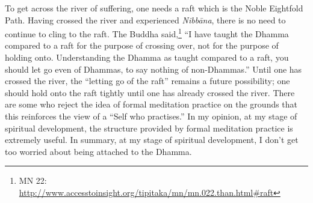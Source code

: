 To get across the river of suffering, one needs a raft which is the Noble Eightfold Path. Having crossed the river and experienced \textit{Nibbāna}, there is no need to continue to cling to the raft. The Buddha said,\footnote{MN 22: \url{http://www.accesstoinsight.org/tipitaka/mn/mn.022.than.html\#raft}} “I have taught the Dhamma compared to a raft for the purpose of crossing over, not for the purpose of holding onto. Understanding the Dhamma as taught compared to a raft, you should let go even of Dhammas, to say nothing of non-Dhammas.” Until one has crossed the river, the “letting go of the raft” remains a future possibility; one should hold onto the raft tightly until one has already crossed the river. There are some who reject the idea of formal meditation \color{blue} practice\color{black} on the grounds that this reinforces the view of a “Self who \color{blue} practises\color{black}.” In my opinion, at my stage of spiritual development, the structure provided by formal meditation \color{blue} practice\color{black} is extremely useful. In summary, at my stage of spiritual development, I don’t get too worried about being attached to the Dhamma.
